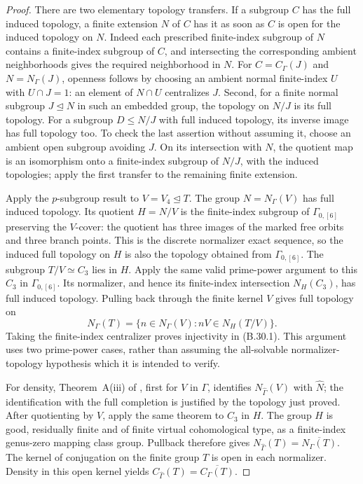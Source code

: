 \begin{proof}
There are two elementary topology transfers.  If a subgroup
$C$ has the full induced topology, a finite extension $N$
of $C$ has it as soon as $C$ is open for the induced topology
on $N$.  Indeed each prescribed finite-index subgroup of $N$
contains a finite-index subgroup of $C$, and intersecting
the corresponding ambient neighborhoods gives the required
neighborhood in $N$.  For $C=C_\Gamma(J)$ and
$N=N_\Gamma(J)$, openness follows by choosing an ambient
normal finite-index $U$ with $U\cap J=1$: an element of
$N\cap U$ centralizes $J$.  Second, for a finite normal
subgroup $J\trianglelefteq N$ in such an embedded group,
the topology on $N/J$ is its full topology.  For a subgroup
$D\leq N/J$ with full induced topology, its inverse image
has full topology too.  To check the last assertion without
assuming it, choose an ambient open subgroup avoiding $J$.
On its intersection with $N$, the quotient map is an
isomorphism onto a finite-index subgroup of $N/J$, with
the induced topologies; apply the first transfer to the
remaining finite extension.

Apply the $p$-subgroup result to $V=V_4\trianglelefteq T$.
The group $N=N_\Gamma(V)$ has full induced topology.
Its quotient $H=N/V$ is the finite-index subgroup of
$\Gamma_{0,[6]}$ preserving the $V$-cover: the quotient
has three images of the marked free orbits and three
branch points.  This is the discrete normalizer exact
sequence, so the induced full topology on $H$ is also
the topology obtained from $\Gamma_{0,[6]}$.
The subgroup $T/V\simeq C_3$ lies in $H$.
Apply the same valid prime-power argument to this $C_3$
in $\Gamma_{0,[6]}$.  Its normalizer, and hence its
finite-index intersection $N_H(C_3)$, has full induced
topology.  Pulling back through the finite kernel $V$
gives full topology on
\[
     N_\Gamma(T)=\{n\in N_\Gamma(V):nV\in N_H(T/V)\}.
\]
Taking the finite-index centralizer proves injectivity in
(B.30.1).  This argument uses two prime-power cases, rather
than assuming the all-solvable normalizer-topology hypothesis
which it is intended to verify.

For density, Theorem~A(iii) of
\cite{CEBoggiZalesskii2025}, first for $V$ in $\Gamma$,
identifies $N_{\widehat\Gamma}(V)$ with $\widehat N$;
the identification with the full completion is justified
by the topology just proved.  After quotienting by $V$,
apply the same theorem to $C_3$ in $H$.  The group $H$
is good, residually finite and of finite virtual
cohomological type, as a finite-index genus-zero mapping
class group.  Pullback therefore gives
$N_{\widehat\Gamma}(T)=\overline{N_\Gamma(T)}$.
The kernel of conjugation on the finite group $T$ is open
in each normalizer.  Density in this open kernel yields
$C_{\widehat\Gamma}(T)=\overline{C_\Gamma(T)}$.


\end{proof}
